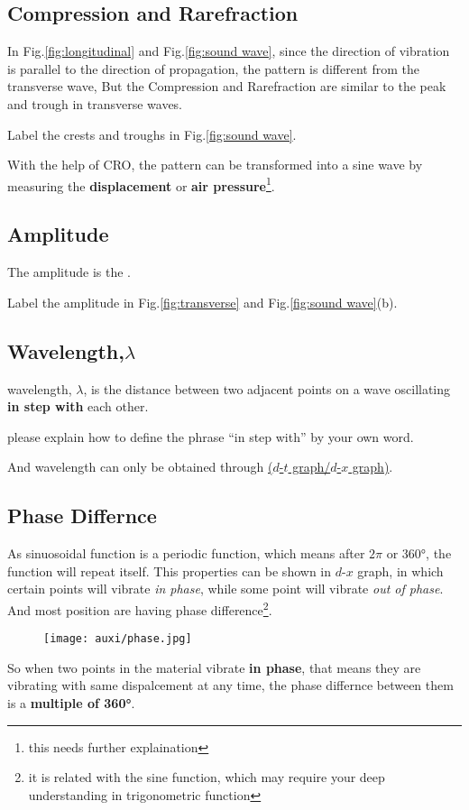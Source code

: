\documentclass[a4paper]{tufte-handout}
\newenvironment{TaskBox} %
{\begin{tcolorbox}[breakable,colback=b1!30,colframe=b1,title=Task]} {\end{tcolorbox}}
\begin{document}
\subsection{Compression and Rarefraction}
In Fig.\ref{fig:longitudinal} and Fig.\ref{fig:sound wave}, since the direction of vibration is parallel to the direction of propagation, the pattern is different from the transverse wave, But the Compression and Rarefraction are similar to the peak and trough in transverse waves. 
\begin{TaskBox}
Label the crests and troughs in Fig.\ref{fig:sound wave}.
\end{TaskBox}
With the help of CRO, the pattern can be transformed into a sine wave by measuring the \textbf{displacement} or \textbf{air pressure}\footnote{this needs further explaination}.  

\subsection{Amplitude}
The amplitude is the \uline{\hfill}.
\begin{TaskBox}
Label the amplitude in Fig.\ref{fig:transverse} and Fig.\ref{fig:sound wave}(b).
\end{TaskBox}

\subsection{Wavelength,$\lambda$}
wavelength, $\lambda$, is the distance between two adjacent points on a wave oscillating \textbf{in step with} each other.
\begin{TaskBox}
please explain how to define the phrase ``in step with'' by your own word.
\vspace{1in}
\end{TaskBox}
And wavelength can only be obtained through \uline{($d$-$t$ graph/$d$-$x$ graph)}. 

\subsection{Phase Differnce}
As sinuosoidal function is a periodic function, which means after $2\pi$ or \ang{360}, the function will repeat itself. This properties can be shown in $d$-$x$ graph, in which certain points will vibrate \emph{in phase}, while some point will vibrate \emph{out of phase}. And most position are having phase difference\footnote{it is related with the sine function, which may require your deep understanding in trigonometric function}.
\begin{figure}[h]
\centering
\texttt{[image: auxi/phase.jpg]}
\end{figure}
So when two points in the material vibrate \textbf{in phase}, that means they are vibrating with same dispalcement at any time, the phase differnce between them is a \textbf{multiple of \ang{360}}.
\end{document}
